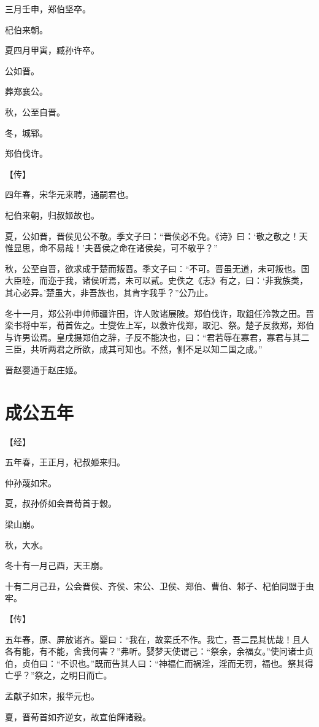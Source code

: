 \documentclass[a4paper,12pt,UTF8,twoside]{ctexbook}
\begin{document}
三月壬申，郑伯坚卒。

杞伯来朝。

夏四月甲寅，臧孙许卒。

公如晋。

葬郑襄公。

秋，公至自晋。

冬，城郓。

郑伯伐许。

【传】

四年春，宋华元来聘，通嗣君也。

杞伯来朝，归叔姬故也。

夏，公如晋，晋侯见公不敬。季文子曰：“晋侯必不免。《诗》曰：‘敬之敬之！天惟显思，命不易哉！’夫晋侯之命在诸侯矣，可不敬乎？”

秋，公至自晋，欲求成于楚而叛晋。季文子曰：“不可。晋虽无道，未可叛也。国大臣睦，而迩于我，诸侯听焉，未可以贰。史佚之《志》有之，曰：‘非我族类，其心必异。’楚虽大，非吾族也，其肯字我乎？”公乃止。

冬十一月，郑公孙申帅师疆许田，许人败诸展陂。郑伯伐许，取鉏任泠敦之田。晋栾书将中军，荀首佐之。士燮佐上军，以救许伐郑，取氾、祭。楚子反救郑，郑伯与许男讼焉。皇戌摄郑伯之辞，子反不能决也，曰：“君若辱在寡君，寡君与其二三臣，共听两君之所欲，成其可知也。不然，侧不足以知二国之成。”

晋赵婴通于赵庄姬。


\chapter{成公五年}



【经】

五年春，王正月，杞叔姬来归。

仲孙蔑如宋。

夏，叔孙侨如会晋荀首于穀。

梁山崩。

秋，大水。

冬十有一月己酉，天王崩。

十有二月己丑，公会晋侯、齐侯、宋公、卫侯、郑伯、曹伯、邾子、杞伯同盟于虫牢。

【传】

五年春，原、屏放诸齐。婴曰：“我在，故栾氏不作。我亡，吾二昆其忧哉！且人各有能，有不能，舍我何害？”弗听。婴梦天使谓己：“祭余，余福女。”使问诸士贞伯，贞伯曰：“不识也。”既而告其人曰：“神福仁而祸淫，淫而无罚，福也。祭其得亡乎？”祭之，之明日而亡。

孟献子如宋，报华元也。

夏，晋荀首如齐逆女，故宣伯餫诸穀。
\end{document}
